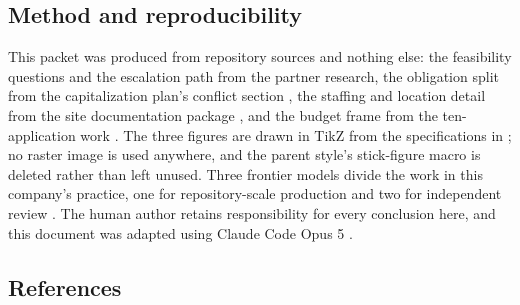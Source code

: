 \subsection{Method and reproducibility}

This packet was produced from repository sources and nothing else: the
feasibility questions and the escalation path from the partner research, the
obligation split from the capitalization plan's conflict section
\cite{capitalplan2026}, the staffing and location detail from the site
documentation package \cite{movein2026}, and the budget frame from the
ten-application work \cite{tenapps2026}. The three figures are drawn in TikZ from
the specifications in ; no raster
image is used anywhere, and the parent style's stick-figure macro is deleted
rather than left unused. Three frontier models divide the work in this company's
practice, one for repository-scale production and two for independent review
\cite{tripartisan2026}. The human author retains responsibility for every
conclusion here, and this document was adapted using Claude Code Opus 5
\cite{repo2026}.

\subsection{References}

\begin{apprefs}


\end{apprefs}
